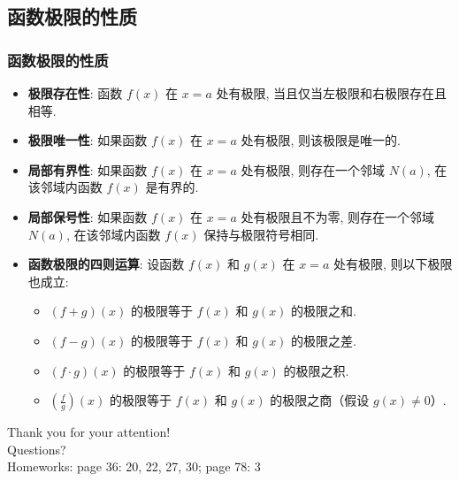\documentclass[
10pt, 
aspectratio=43, 
]{beamer}
\begin{document}
\subsection{函数极限的性质}
\begin{frame}
\frametitle{函数极限的性质}

\begin{itemize}
\item<1-> \textbf{极限存在性}: 函数 $f(x)$ 在 $x=a$ 处有极限, 当且仅当左极限和右极限存在且相等. 
\item<2-> \textbf{极限唯一性}: 如果函数 $f(x)$ 在 $x=a$ 处有极限, 则该极限是唯一的. 
\item<3-> \textbf{局部有界性}: 如果函数 $f(x)$ 在 $x=a$ 处有极限, 则存在一个邻域 $N(a)$, 在该邻域内函数 $f(x)$ 是有界的. 
\item<4-> \textbf{局部保号性}: 如果函数 $f(x)$ 在 $x=a$ 处有极限且不为零, 则存在一个邻域 $N(a)$, 在该邻域内函数 $f(x)$ 保持与极限符号相同. 
\item<5-> \textbf{函数极限的四则运算}: 设函数 $f(x)$ 和 $g(x)$ 在 $x=a$ 处有极限, 则以下极限也成立: 
\begin{itemize}
    \item $(f+g)(x)$ 的极限等于 $f(x)$ 和 $g(x)$ 的极限之和. 
    \item $(f-g)(x)$ 的极限等于 $f(x)$ 和 $g(x)$ 的极限之差. 
    \item $(f \cdot g)(x)$ 的极限等于 $f(x)$ 和 $g(x)$ 的极限之积. 
    \item $\left(\frac{f}{g}\right)(x)$ 的极限等于 $f(x)$ 和 $g(x)$ 的极限之商（假设 $g(x) \neq 0$）. 
\end{itemize}
\end{itemize}

\end{frame}

\begin{frame}[plain]
	\vfill
	\centering
	{
		\centering \Huge \color{white} Thank you for your attention!\\
  Questions?\\[10pt]Homeworks:  page 36:  20,  22,  27,  30; page 78:  3
  
	}
	\vfill
\end{frame}
\end{document}
